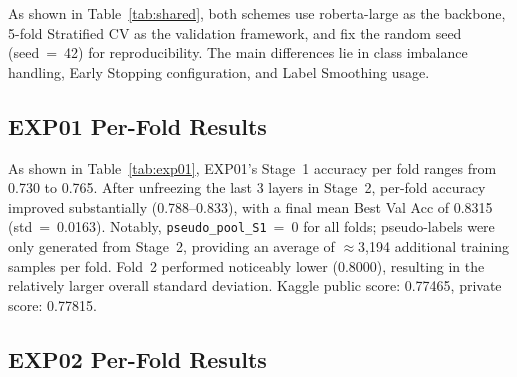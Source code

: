 \documentclass[10pt,twocolumn]{article}
\begin{document}
As shown in Table~\ref{tab:shared}, both schemes use roberta-large as
the backbone, 5-fold Stratified CV as the validation framework, and fix
the random seed (seed~=~42) for reproducibility. The main differences
lie in class imbalance handling, Early Stopping configuration, and Label
Smoothing usage.

\subsection{EXP01 Per-Fold Results}

\begin{table}[h]
\centering
\caption{EXP01 per-fold validation results}
\label{tab:exp01}
\end{table}

As shown in Table~\ref{tab:exp01}, EXP01's Stage~1 accuracy per fold
ranges from 0.730 to 0.765. After unfreezing the last 3 layers in
Stage~2, per-fold accuracy improved substantially (0.788--0.833), with
a final mean Best Val Acc of 0.8315 (std~=~0.0163). Notably,
\texttt{pseudo\_pool\_S1}~=~0 for all folds; pseudo-labels were only
generated from Stage~2, providing an average of $\approx$3,194
additional training samples per fold. Fold~2 performed noticeably lower
(0.8000), resulting in the relatively larger overall standard deviation.
Kaggle public score: 0.77465, private score: 0.77815.

\subsection{EXP02 Per-Fold Results}
\end{document}
